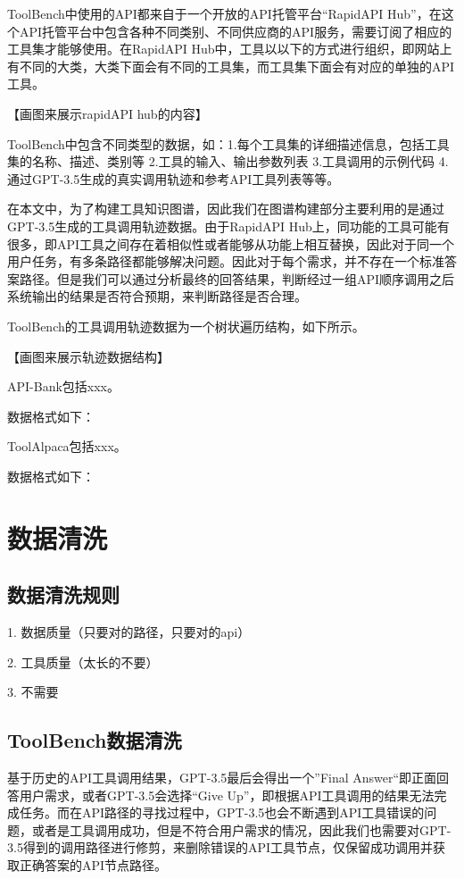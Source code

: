 ToolBench中使用的API都来自于一个开放的API托管平台“RapidAPI Hub”，在这个API托管平台中包含各种不同类别、不同供应商的API服务，需要订阅了相应的工具集才能够使用。在RapidAPI Hub中，工具以以下的方式进行组织，即网站上有不同的大类，大类下面会有不同的工具集，而工具集下面会有对应的单独的API工具。

【画图来展示rapidAPI hub的内容】

ToolBench中包含不同类型的数据，如：1.每个工具集的详细描述信息，包括工具集的名称、描述、类别等 2.工具的输入、输出参数列表 3.工具调用的示例代码 4.通过GPT-3.5生成的真实调用轨迹和参考API工具列表等等。

在本文中，为了构建工具知识图谱，因此我们在图谱构建部分主要利用的是通过GPT-3.5生成的工具调用轨迹数据。由于RapidAPI Hub上，同功能的工具可能有很多，即API工具之间存在着相似性或者能够从功能上相互替换，因此对于同一个用户任务，有多条路径都能够解决问题。因此对于每个需求，并不存在一个标准答案路径。但是我们可以通过分析最终的回答结果，判断经过一组API顺序调用之后系统输出的结果是否符合预期，来判断路径是否合理。

ToolBench的工具调用轨迹数据为一个树状遍历结构，如下所示。

【画图来展示轨迹数据结构】

API-Bank包括xxx。

数据格式如下：

ToolAlpaca包括xxx。

数据格式如下：

\section{数据清洗}

\subsection{数据清洗规则}

1. 数据质量（只要对的路径，只要对的api）

2. 工具质量（太长的不要）

3. 不需要 

\subsection{ToolBench数据清洗}

基于历史的API工具调用结果，GPT-3.5最后会得出一个”Final Answer“即正面回答用户需求，或者GPT-3.5会选择“Give Up”，即根据API工具调用的结果无法完成任务。而在API路径的寻找过程中，GPT-3.5也会不断遇到API工具错误的问题，或者是工具调用成功，但是不符合用户需求的情况，因此我们也需要对GPT-3.5得到的调用路径进行修剪，来删除错误的API工具节点，仅保留成功调用并获取正确答案的API节点路径。

